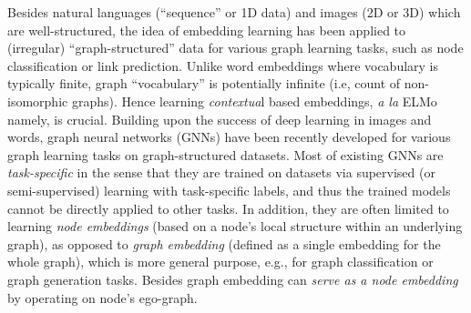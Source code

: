 \documentclass{article}
\begin{document}
Besides natural languages (``sequence'' or 1D data) and images (2D or 3D) which are well-structured, the idea of embedding learning has been applied to (irregular) ``graph-structured'' data for various graph learning tasks, such as node classification or link prediction. Unlike word embeddings where vocabulary is typically finite, graph ``vocabulary'' is potentially infinite (i.e, count of non-isomorphic graphs). Hence learning {\em contextua}l based embeddings, {\em a la}  ELMo~\cite{peters2018deep}  namely, is crucial. Building upon the success of deep learning in images and words, graph neural networks (GNNs) have been recently developed for various graph learning tasks on graph-structured datasets. Most of existing GNNs are {\em task-specific} in the sense that   they are trained on datasets via supervised (or semi-supervised)  learning with task-specific labels, and thus the trained models cannot be directly applied to other tasks. In addition, they are often limited to learning {\em node embeddings}  	  (based on a node's local structure within an underlying graph), as opposed to {\em graph embedding} (defined as a single embedding for the whole graph), which is more general purpose, e.g.,  for graph classification or graph generation tasks. Besides graph embedding can \emph{serve as a node embedding} by operating on node's ego-graph.  
\end{document}
